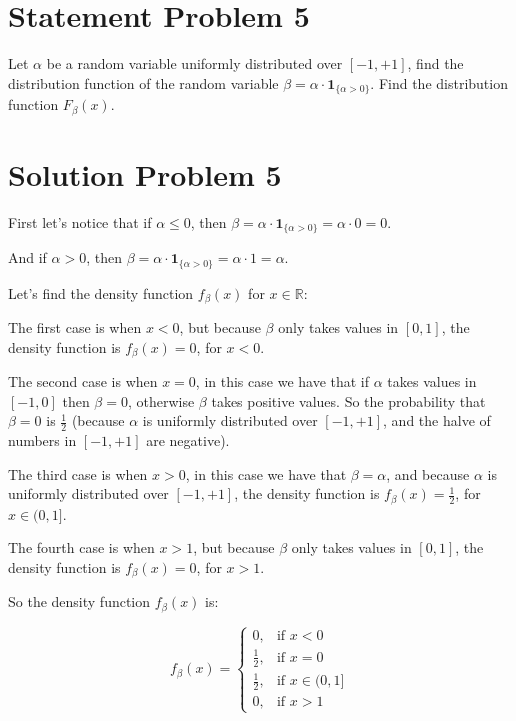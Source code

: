 \section*{Statement Problem 5}

Let $\alpha$ be a random variable uniformly distributed over $[-1, +1]$, find the distribution function of the random variable $\beta = \alpha \cdot \textbf{1}_{\{\alpha > 0\}}$. Find the distribution function $F_\beta(x)$.


\section*{Solution Problem 5}

First let's notice that if $\alpha \leq 0$, then $\beta = \alpha \cdot \textbf{1}_{\{\alpha > 0\}} = \alpha \cdot 0 = 0$.

And if $\alpha > 0$, then $\beta = \alpha \cdot \textbf{1}_{\{\alpha > 0\}} = \alpha \cdot 1 = \alpha$.

Let's find the density function $f_\beta(x)$ for $x \in \mathbb{R}$:

The first case is when $x < 0$, but because $\beta$ only takes values in $[0, 1]$, the density function is $f_\beta(x) = 0$, for $x < 0$.

The second case is when $x = 0$, in this case we have that if $\alpha$ takes values in $[-1, 0]$ then $\beta = 0$, otherwise
$\beta$ takes positive values. So the probability that $\beta = 0$ is $\frac{1}{2}$ (because $\alpha$ is uniformly distributed
over $[-1, +1]$, and the halve of numbers in $[-1, +1]$ are negative).

The third case is when $x > 0$, in this case we have that $\beta = \alpha$, and because $\alpha$ is uniformly distributed
over $[-1, +1]$, the density function is $f_\beta(x) = \frac{1}{2}$, for $x \in (0, 1]$.

The fourth case is when $x > 1$, but because $\beta$ only takes values in $[0, 1]$, the density function is $f_\beta(x) = 0$, for $x > 1$.

So the density function $f_\beta(x)$ is:

\begin{equation}
    f_\beta(x) = \begin{cases}
        0,           & \text{if } x < 0        \\
        \frac{1}{2}, & \text{if } x = 0        \\
        \frac{1}{2}, & \text{if } x \in (0, 1] \\
        0,           & \text{if } x > 1
    \end{cases}
\end{equation}

